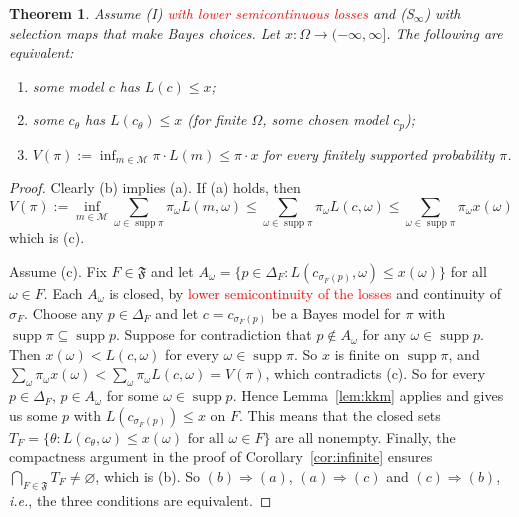 \documentclass[11pt]{article}
\newtheorem{theorem}{Theorem}[section]
\theoremstyle{definition}
\theoremstyle{remark}
\newcommand{\M}{\mathcal M}
\newcommand{\F}{\mathfrak F}
\newcommand{\supp}{\operatorname{supp}}
\begin{document}
\begin{theorem}\label{thm:margin}
Assume (I) \textcolor{red}{with lower semicontinuous losses} and (S$_\infty$) with selection maps that make Bayes choices. Let $x:\Omega\to(-\infty,\infty]$. The following are equivalent:
\begin{enumerate}[label=(\alph*)]
\item some model $c$ has $L(c)\le x$;
\item some $c_\theta$ has $L(c_\theta)\le x$ (for finite $\Omega$, some chosen model $c_p$);
\item $V(\pi):=\inf_{m\in\M}\pi\cdot L(m)\le\pi\cdot x$ for every finitely supported probability $\pi$.
\end{enumerate}
\end{theorem}
\begin{proof}
Clearly (b) implies (a). If (a) holds, then
\[
V(\pi):=\inf_{m\in\M}\sum_{\omega\in\supp\pi}\pi_\omega L(m,\omega)\le\sum_{\omega\in\supp\pi}\pi_\omega L(c,\omega)\le\sum_{\omega\in\supp\pi}\pi_\omega x(\omega)
\]
which is (c).

Assume (c). Fix $F\in\F$ and let $A_\omega=\{p\in\Delta_F:L(c_{\sigma_F(p)},\omega)\le x(\omega)\}$ for all $\omega\in F$. Each $A_\omega$ is closed, by \textcolor{red}{lower semicontinuity of the losses} and continuity of $\sigma_F$. Choose any $p\in\Delta_F$ and let $c=c_{\sigma_F(p)}$ be a Bayes model for $\pi$ with $\supp\pi\subseteq\supp p$. Suppose for contradiction that $p\not\in A_\omega$ for any $\omega\in\supp p$. Then $x(\omega)<L(c,\omega)$ for every $\omega\in\supp\pi$. So $x$ is finite on $\supp\pi$, and $\sum_\omega\pi_\omega x(\omega)<\sum_\omega\pi_\omega L(c,\omega)=V(\pi)$, which contradicts (c). So for every $p\in\Delta_F$, $p\in A_\omega$ for some $\omega\in\supp p$. Hence Lemma~\ref{lem:kkm} applies and gives us some $p$ with $L(c_{\sigma_F(p)})\le x$ on $F$. This means that the closed sets $T_F=\{\theta:L(c_\theta,\omega)\le x(\omega)\text{ for all }\omega\in F\}$ are all nonempty. Finally, the compactness argument in the proof of Corollary~\ref{cor:infinite} ensures $\bigcap_{F\in\F}T_F\neq \varnothing$, which is (b). So $(b)\Rightarrow (a)$, $(a)\Rightarrow (c)$ and $(c)\Rightarrow (b)$, \textit{i.e.}, the three conditions are equivalent.
\end{proof}


\end{document}
